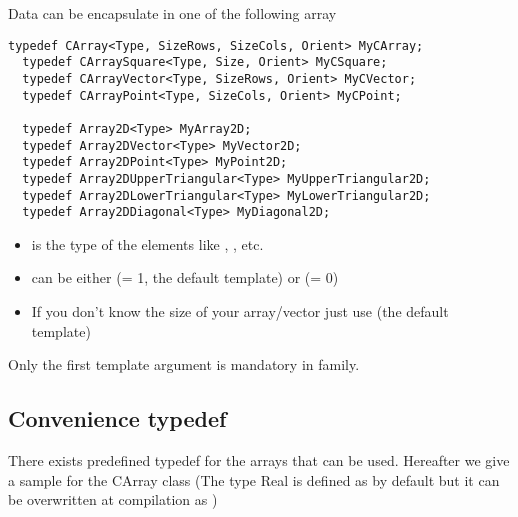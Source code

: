 \documentclass[a4paper,10pt]{article}
\begin{document}
Data can be encapsulate in one of the following array
\begin{lstlisting}[style=customcpp]
  typedef CArray<Type, SizeRows, SizeCols, Orient> MyCArray;
  typedef CArraySquare<Type, Size, Orient> MyCSquare;
  typedef CArrayVector<Type, SizeRows, Orient> MyCVector;
  typedef CArrayPoint<Type, SizeCols, Orient> MyCPoint;

  typedef Array2D<Type> MyArray2D;
  typedef Array2DVector<Type> MyVector2D;
  typedef Array2DPoint<Type> MyPoint2D;
  typedef Array2DUpperTriangular<Type> MyUpperTriangular2D;
  typedef Array2DLowerTriangular<Type> MyLowerTriangular2D;
  typedef Array2DDiagonal<Type> MyDiagonal2D;
\end{lstlisting}

\begin{itemize}
\item {} is the type of the elements like , , etc.
\item {} can be either 
 (= 1, the default template) or  (= 0)
\item If you don't know the size of your array/vector just use
 (the default template)
\end{itemize}
\begin{note}
Only the first template argument is mandatory in  family.
\end{note}

\subsection{Convenience typedef}

There exists predefined typedef for the arrays that can be used.
Hereafter we give a sample for the CArray class (The type Real is defined
as  by default but it can be overwritten at
compilation as )
\end{document}
